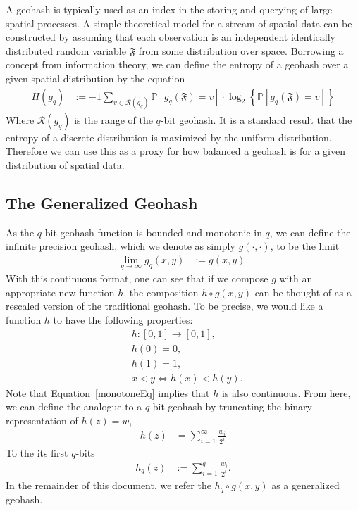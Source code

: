 \documentclass[nips13submit_09,times,art10]{article} %
\begin{document}
A geohash is typically used as an index in the storing and querying of large
spatial processes. A simple theoretical model for a stream of spatial data can
be constructed by assuming that each observation is an independent identically
distributed random variable $\mathfrak{F}$ from some distribution over space.
Borrowing a concept from information theory, we can define the entropy of a geohash
over a given spatial distribution by the equation
\begin{align}
H(g_q) &:= -1 \sum_{v \in \mathcal{R}(g_q)} \mathbb{P} \left[ g_q(\mathfrak{F}) = v\right] \cdot
            \log_2 \left\{ \mathbb{P} \left[ g_q(\mathfrak{F}) = v\right] \right\} \label{entropyDef}
\end{align}
Where $\mathcal{R}(g_q)$ is the range of the $q$-bit geohash. It is a standard result
that the entropy of a discrete distribution is maximized by the uniform distribution.
Therefore we can use this as a proxy for how balanced a geohash is for a given distribution
of spatial data.

\subsection{The Generalized Geohash}

As the $q$-bit geohash function is bounded and monotonic in $q$, we can define the infinite
precision geohash, which we denote as simply $g(\cdot, \cdot)$, to be the limit
\begin{align}
\lim_{q \rightarrow \infty} g_q(x,y) &:= g(x,y).
\end{align}
With this continuous format, one can see that if we compose $g$ with an appropriate new function
$h$, the composition $h \circ g(x,y)$ can be thought of as a rescaled version of the
traditional geohash. To be precise, we would like a function $h$ to have the following properties:
\begin{align}
&h: [0,1] \rightarrow [0,1], \label{hDef} \\
&h(0) = 0, \\
&h(1) = 1, \\
&x < y \iff h(x) < h(y). \label{monotoneEq}
\end{align}
Note that Equation~\ref{monotoneEq} implies that $h$ is also continuous. From here, we can define
the analogue to a $q$-bit geohash by truncating the binary representation of $h(z) = w$,
\begin{align}
h(z) &= \sum_{i=1}^{\infty} \frac{w_i}{2^i}
\end{align}
To the its first $q$-bits
\begin{align}
h_q(z) &:= \sum_{i=1}^{q} \frac{w_i}{2^i}.
\end{align}
In the remainder of this document, we refer the $h_q \circ g(x,y)$ as a generalized geohash.
\end{document}
